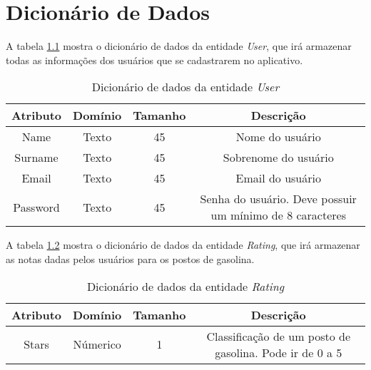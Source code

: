\chapter{Dicionário de Dados}
\label{chap:dicionario}

A tabela \ref{dic:user} mostra o dicionário de dados da entidade \textit{User}, que irá armazenar todas as informações dos usuários que se cadastrarem no aplicativo.
\begin{table}[h]
\centering
\caption{Dicionário de dados da entidade \textit{User}}
\label{dic:user}
\begin{tabular}{cccc}
\toprule
\textbf{Atributo} & \textbf{Domínio} & \textbf{Tamanho} & \textbf{Descrição} \\
\midrule
Name                            & Texto                          & 45                             & Nome do usuário \\
Surname                         & Texto                          & 45                             & Sobrenome do usuário\\
Email                           & Texto                          & 45                             & Email do usuário\\
Password                        & Texto                          & 45                             & Senha do usuário. Deve possuir um mínimo de 8 caracteres\\
\bottomrule
\end{tabular}
\end{table}

A tabela \ref{dic:rating} mostra o dicionário de dados da entidade \textit{Rating}, que irá armazenar as notas dadas pelos usuários para os postos de gasolina.
\begin{table}[h]
\centering
\caption{Dicionário de dados da entidade \textit{Rating}}
\label{dic:rating}
\begin{tabular}{cccc}
\toprule
\textbf{Atributo} & \textbf{Domínio} & \textbf{Tamanho} & \textbf{Descrição} \\
\midrule
Stars                           & Númerico                       &1                               & Classificação de um posto de gasolina. Pode ir de 0 a 5\\
\bottomrule
\end{tabular}
\end{table}

